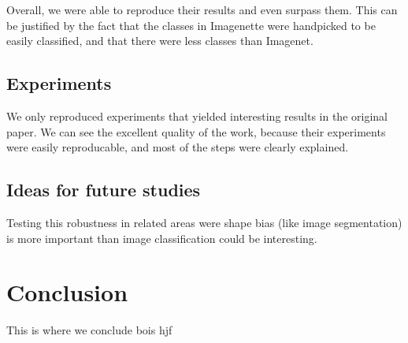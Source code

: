 \documentclass{article}
\begin{document}
Overall, we were able to reproduce their results and
even surpass them. This can be justified by the fact that the classes
in Imagenette were handpicked to be easily classified, and that there were less 
classes than Imagenet.

\subsection{Experiments}

We only reproduced experiments that yielded interesting results 
in the original paper. We can see the excellent quality of the work, 
because their experiments were easily reproducable, and most of the 
steps were clearly explained.

\subsection{Ideas for future studies}

Testing this robustness in related areas were shape bias (like image segmentation) 
is more important than image classification could be interesting.

\section{Conclusion}

This is where we conclude bois hjf






\end{document}
